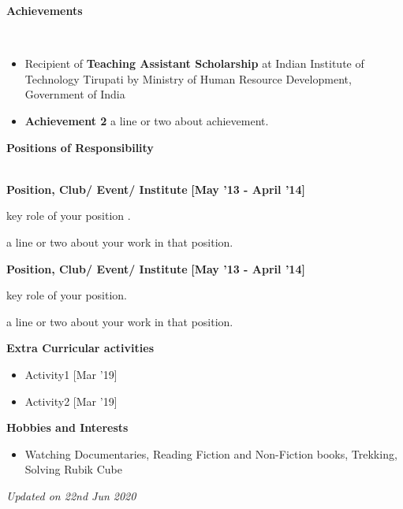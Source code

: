 \documentclass[a4paper,10pt]{article}
\begin{document}
\colorbox{titleColor}{\parbox{6.7in}{\textbf{Achievements}}}\\[0.08in]
\begin{itemize}

\setlength{\itemsep}{1pt}
\item Recipient of \textbf{Teaching Assistant Scholarship} at Indian Institute of Technology Tirupati by Ministry of Human
Resource Development, Government of India
\item \textbf{Achievement 2} a line or two about achievement.
\end{itemize}

\colorbox{titleColor}{\parbox{6.7in}{\textbf{Positions of Responsibility}}}\\

\textbf{Position, Club/ Event/ Institute}  \hfill {\small{{\textbf{[May '13 - April '14]}}}\/}
\begin{itemize*}
\item key role of your position .
\item a line or two about your work in that position.
\end{itemize*}

\textbf{Position, Club/ Event/ Institute}  \hfill {\small{{\textbf{[May '13 - April '14]}}}\/}
\begin{itemize*}
\item key role of your position.
\item a line or two about your work in that position.
\end{itemize*}

\colorbox{titleColor}{\parbox{6.7in}{\textbf{Extra Curricular activities}}}

\begin{itemize}
  \setlength{\itemsep}{1pt}
  \item Activity1 \hfill {\small{{[Mar '19]}}\/}
  \item Activity2 \hfill {\small{{[Mar '19]}}\/}
\end{itemize}

\colorbox{titleColor}{\parbox{6.7in}{\textbf{Hobbies and Interests}}}

\begin{itemize}
  \setlength{\itemsep}{1pt}
  \item Watching Documentaries, Reading Fiction and Non-Fiction books, Trekking, Solving Rubik Cube
\end{itemize}

\textit{Updated on 22nd Jun 2020}
\end{document}
